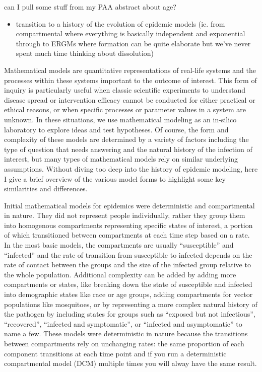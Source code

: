 \documentclass [11pt, proquest] {uwthesis}[2015/03/03]
\providecommand{\tightlist}{%
  \setlength{\itemsep}{0pt}\setlength{\parskip}{0pt}}
\begin{document}
can I pull some stuff from my PAA abstract about age?
\begin{itemize}
\tightlist
\item
  transition to a history of the evolution of epidemic models (ie. from
  compartmental where everything is basically independent and
  exponential through to ERGMs where formation can be quite elaborate
  but we've never spent much time thinking about dissolution)
\end{itemize}
Mathematical models are quantitative representations of real-life
systems and the processes within these systems important to the outcome
of interest. This form of inquiry is particularly useful when classic
scientific experiments to understand disease spread or intervention
efficacy cannot be conducted for either practical or ethical reasons, or
when specific processes or parameter values in a system are unknown. In
these situations, we use mathematical modeling as an in-silico
laboratory to explore ideas and test hypotheses. Of course, the form and
complexity of these models are determined by a variety of factors
including the type of question that needs answering and the natural
history of the infection of interest, but many types of mathematical
models rely on similar underlying assumptions. Without diving too deep
into the history of epidemic modeling, here I give a brief overview of
the various model forms to highlight some key similarities and
differences.

Initial mathematical models for epidemics were deterministic and
compartmental in nature. They did not represent people individually,
rather they group them into homogenous compartments representing
specific states of interest, a portion of which transitioned between
compartments at each time step based on a rate. In the most basic
models, the compartments are usually ``susceptible'' and ``infected''
and the rate of transition from susceptible to infected depends on the
rate of contact between the groups and the size of the infected group
relative to the whole population. Additional complexity can be added by
adding more compartments or states, like breaking down the state of
susceptible and infected into demographic states like race or age
groups, adding compartments for vector populations like mosquitoes, or
by representing a more complex natural history of the pathogen by
including states for groups such as ``exposed but not infectious'',
``recovered'', ``infected and symptomatic'', or ``infected and
asymptomatic'' to name a few. These models were deterministic in nature
because the transitions between compartments rely on unchanging rates:
the same proportion of each component transitions at each time point and
if you run a deterministic compartmental model (DCM) multiple times you
will alway have the same result.
\end{document}
